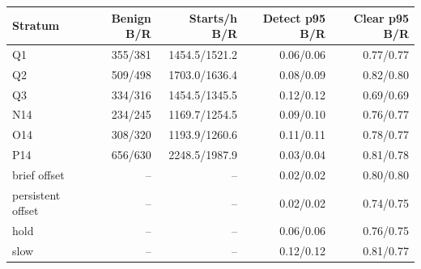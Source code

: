 \begin{tabular}{lrrrr}\toprule
Stratum & Benign B/R & Starts/h B/R & Detect p95 B/R & Clear p95 B/R\\\midrule
Q1 & 355/381 & 1454.5/1521.2 & 0.06/0.06 & 0.77/0.77 \\
Q2 & 509/498 & 1703.0/1636.4 & 0.08/0.09 & 0.82/0.80 \\
Q3 & 334/316 & 1454.5/1345.5 & 0.12/0.12 & 0.69/0.69 \\
N14 & 234/245 & 1169.7/1254.5 & 0.09/0.10 & 0.76/0.77 \\
O14 & 308/320 & 1193.9/1260.6 & 0.11/0.11 & 0.78/0.77 \\
P14 & 656/630 & 2248.5/1987.9 & 0.03/0.04 & 0.81/0.78 \\
brief offset & -- & -- & 0.02/0.02 & 0.80/0.80 \\
persistent offset & -- & -- & 0.02/0.02 & 0.74/0.75 \\
hold & -- & -- & 0.06/0.06 & 0.76/0.75 \\
slow & -- & -- & 0.12/0.12 & 0.81/0.77 \\
\bottomrule\end{tabular}
